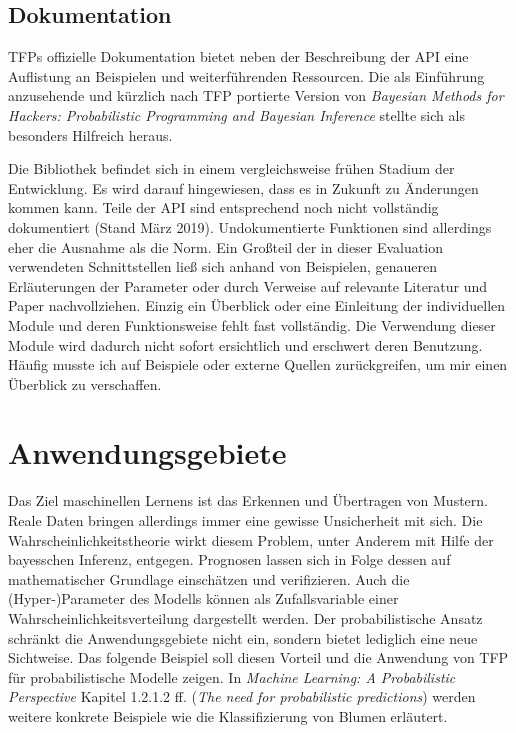 \documentclass[12pt]{article}
\begin{document}
\subsection{Dokumentation}
TFPs offizielle Dokumentation bietet neben der Beschreibung der API eine Auflistung an Beispielen und weiterführenden Ressourcen. Die als Einführung anzusehende und kürzlich nach TFP portierte Version von \textit{Bayesian Methods for Hackers: Probabilistic Programming and Bayesian Inference}\cite{Davidson-Pilon2015} stellte sich als besonders Hilfreich heraus.

Die Bibliothek befindet sich in einem vergleichsweise frühen Stadium der Entwicklung. Es wird darauf hingewiesen, dass es in Zukunft zu Änderungen kommen kann. Teile der API sind entsprechend noch nicht vollständig dokumentiert (Stand März 2019).
Undokumentierte Funktionen sind allerdings eher die Ausnahme als die Norm. Ein Großteil der in dieser Evaluation verwendeten Schnittstellen ließ sich anhand von Beispielen, genaueren Erläuterungen der Parameter oder durch Verweise auf relevante Literatur und Paper nachvollziehen. Einzig ein Überblick oder eine Einleitung der individuellen Module und deren Funktionsweise fehlt fast vollständig. Die Verwendung dieser Module wird dadurch nicht sofort ersichtlich und erschwert deren Benutzung. Häufig musste ich auf Beispiele oder externe Quellen zurückgreifen, um mir einen Überblick zu verschaffen.

\section{Anwendungsgebiete}

Das Ziel maschinellen Lernens ist das Erkennen und Übertragen von Mustern. Reale Daten bringen allerdings immer eine gewisse Unsicherheit mit sich. Die Wahrscheinlichkeitstheorie wirkt diesem Problem, unter Anderem mit Hilfe der bayesschen Inferenz, entgegen. Prognosen lassen sich in Folge dessen auf mathematischer Grundlage einschätzen und verifizieren. Auch die (Hyper-)Parameter des Modells können als Zufallsvariable einer Wahrscheinlichkeitsverteilung dargestellt werden. Der probabilistische Ansatz schränkt die Anwendungsgebiete nicht ein, sondern bietet lediglich eine neue Sichtweise. Das folgende Beispiel soll diesen Vorteil und die Anwendung von TFP für probabilistische Modelle zeigen. In \textit{Machine Learning: A Probabilistic Perspective}\cite{Murphy2012} Kapitel 1.2.1.2 ff. (\textit{The need for probabilistic predictions}) werden weitere konkrete Beispiele wie die Klassifizierung von Blumen erläutert. 
\end{document}
